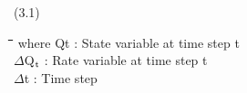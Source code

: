  \bigskip
\strut\hfill (3.1)
\nwln
\begin{tabbing}
\hspace{1.27cm}\=\hspace{1.27cm}\=\hspace{1.27cm}\=\hspace{1.27cm}\=%
\hspace{1.27cm}\=\hspace{1.27cm}\=\hspace{1.27cm}\=\hspace{1.27cm}\=%
\hspace{1.27cm}\=\hspace{1.27cm}\=\kill
where\> \> Qt\> : State variable at time step t\> \> \> \> \> \> \> [unit]\\
\>\> $\Delta$Q$_{{\rm t}}$\> : Rate variable at time step t\> \> \> \> \> \> \> [unit d$^{{\rm -1}}$]\\
\>\> $\Delta$t\> : Time step\> \> \> \> \> \> \> [d]
\end{tabbing}
